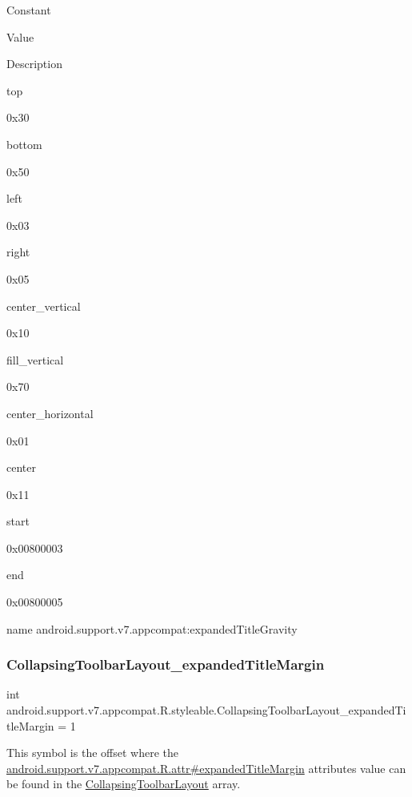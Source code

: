 Constant

Value

Description 

{\ttfamily top}

0x30

{\ttfamily bottom}

0x50

{\ttfamily left}

0x03

{\ttfamily right}

0x05

{\ttfamily center\+\_\+vertical}

0x10

{\ttfamily fill\+\_\+vertical}

0x70

{\ttfamily center\+\_\+horizontal}

0x01

{\ttfamily center}

0x11

{\ttfamily start}

0x00800003

{\ttfamily end}

0x00800005

name android.\+support.\+v7.\+appcompat\+:expanded\+Title\+Gravity \mbox{\label{classandroid_1_1support_1_1v7_1_1appcompat_1_1R_1_1styleable_aa0c9f6ddca433d8759b5d37b92f038f0}} 
\subsubsection{\texorpdfstring{Collapsing\+Toolbar\+Layout\+\_\+expanded\+Title\+Margin}{CollapsingToolbarLayout\_expandedTitleMargin}}
{\footnotesize\ttfamily int android.\+support.\+v7.\+appcompat.\+R.\+styleable.\+Collapsing\+Toolbar\+Layout\+\_\+expanded\+Title\+Margin = 1\hspace{0.3cm}{\ttfamily [static]}}

This symbol is the offset where the \hyperlink{classandroid_1_1support_1_1v7_1_1appcompat_1_1R_1_1attr_a7b201fb107f130eb06fe70e6910942ca}{android.\+support.\+v7.\+appcompat.\+R.\+attr\#expanded\+Title\+Margin} attribute\textquotesingle{}s value can be found in the \hyperlink{classandroid_1_1support_1_1v7_1_1appcompat_1_1R_1_1styleable_a8d282d917f35e5a08dd37db243410383}{Collapsing\+Toolbar\+Layout} array.

